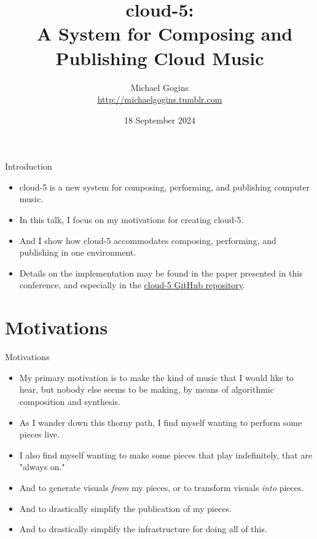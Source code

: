 \documentclass{beamer}
\title[cloud-5] %
{cloud-5: \\\
A System for Composing and Publishing Cloud Music}
\author[Gogins] %
{Michael Gogins \\ \url{http://michaelgogins.tumblr.com} }
\institute[Irreducible Productions] %
{
  Irreducible Productions\\
  New York
}
\date[18 September 2024] %
{18 September 2024}
\begin{document}

\begin{frame}
  \titlepage
\end{frame}

\begin{frame}{Introduction}
\begin{itemize}
\item cloud-5 is a new system for composing, performing, and publishing computer music. 
\item In this talk, I focus on my motivations for creating cloud-5.
\item And I show how cloud-5 accommodates composing, performing, and publishing in one environment. 
\item Details on the implementation may be found in the paper presented in this conference, and especially in the \href{https://github.com/gogins/cloud-5}{cloud-5 GitHub repository}.
\end{itemize}
\end{frame}


\section{Motivations}

\begin{frame}{Motivations}
\begin{itemize}
\item My primary motivation is to make the kind of music that I would like to hear, but nobody else seems to be making, by means of algorithmic composition and synthesis.
\item As I wander down this thorny path, I find myself wanting to perform some pieces live.
\item I also find myself wanting to make some pieces that play indefinitely, that are "always on."
\item And to generate visuals \emph{from} my pieces, or to transform visuals \emph{into} pieces.
\item And to drastically simplify the publication of my pieces.
\item And to drastically simplify the infrastructure for doing all of this.
\end{itemize}
\end{frame}
\end{document}
